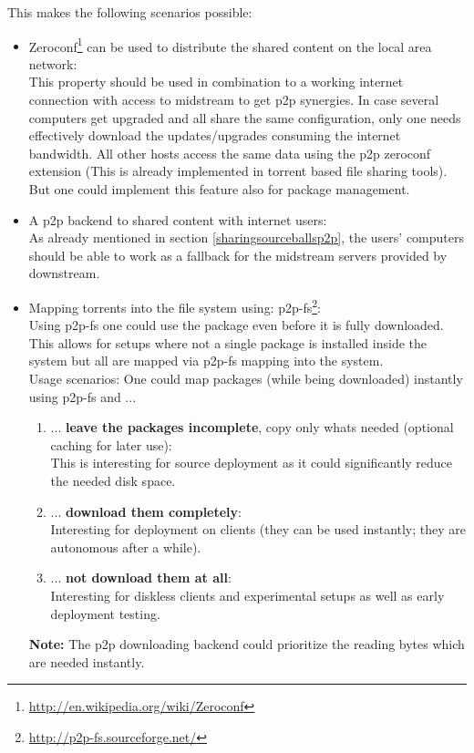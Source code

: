 \documentclass[a4paper,10pt]{article}
\begin{document}
This makes the following scenarios possible:
\begin{itemize}
\item Zeroconf\footnote{\url{http://en.wikipedia.org/wiki/Zeroconf}} can be used to distribute the shared content on the local area network:\\
      This property should be used in combination to a working internet connection with access to midstream to get p2p synergies. In case several computers get upgraded and all share the same configuration, only one needs effectively download the updates/upgrades consuming the internet bandwidth. All other hosts access the same data using the p2p zeroconf extension (This is already implemented in torrent based file sharing tools). But one could implement this feature also for package management.
\item A p2p backend to shared content with internet users:\\
      As already mentioned in section \ref{sharingsourceballsp2p}, the users' computers should be able to work as a fallback for the midstream servers provided by downstream.
\item Mapping torrents into the file system using: p2p-fs\footnote{\url{http://p2p-fs.sourceforge.net/}}:\\
      Using p2p-fs one could use the package even before it is fully downloaded. This allows for setups where not a single package is installed inside the system but all are mapped via p2p-fs mapping into the system. \\

      Usage scenarios: One could map packages (while being downloaded) instantly using p2p-fs and ...
      \begin{enumerate}
        \item ... \textbf{leave the packages incomplete}, copy only whats needed (optional caching for later use): \\ 
               This is interesting for source deployment as it could significantly reduce the needed disk space.
        \item ... \textbf{download them completely}:\\
               Interesting for deployment on clients (they can be used instantly; they are autonomous after a while).
        \item ... \textbf{not download them at all}:\\ 
               Interesting for diskless clients and experimental setups as well as early deployment testing.
      \end{enumerate}
\textbf{Note:} The p2p downloading backend could prioritize the reading bytes which are needed instantly.


\end{itemize}
\end{document}

